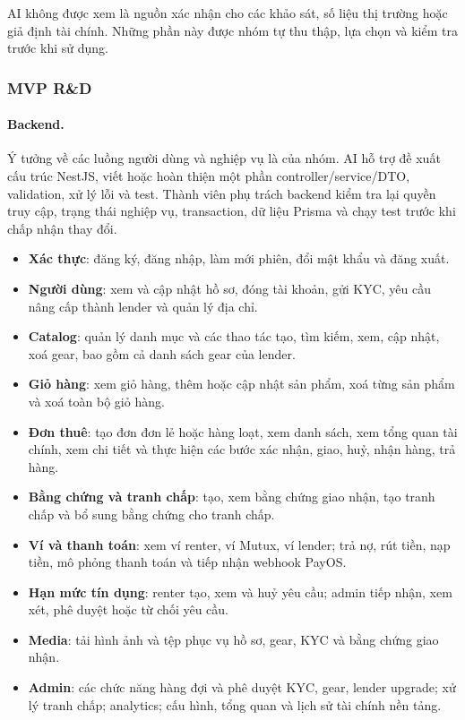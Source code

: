AI không được xem là nguồn xác nhận cho các khảo sát, số liệu thị trường hoặc
giả định tài chính. Những phần này được nhóm tự thu thập, lựa chọn và kiểm tra
trước khi sử dụng.

\subsubsection{MVP R\&D}

\paragraph{Backend.}
Ý tưởng về các luồng người dùng và nghiệp vụ là của nhóm. AI hỗ trợ đề xuất
cấu trúc NestJS, viết hoặc hoàn thiện một phần controller/service/DTO,
validation, xử lý lỗi và test. Thành viên phụ trách backend kiểm tra lại
quyền truy cập, trạng thái nghiệp vụ, transaction, dữ liệu Prisma và chạy test
trước khi chấp nhận thay đổi.
\begin{itemize}
    \item \textbf{Xác thực}: đăng ký, đăng nhập, làm mới phiên, đổi mật khẩu
    và đăng xuất.
    \item \textbf{Người dùng}: xem và cập nhật hồ sơ, đóng tài khoản, gửi KYC,
    yêu cầu nâng cấp thành lender và quản lý địa chỉ.
    \item \textbf{Catalog}: quản lý danh mục và các thao tác tạo, tìm kiếm,
    xem, cập nhật, xoá gear, bao gồm cả danh sách gear của lender.
    \item \textbf{Giỏ hàng}: xem giỏ hàng, thêm hoặc cập nhật sản phẩm, xoá
    từng sản phẩm và xoá toàn bộ giỏ hàng.
    \item \textbf{Đơn thuê}: tạo đơn đơn lẻ hoặc hàng loạt, xem danh sách,
    xem tổng quan tài chính, xem chi tiết và thực hiện các bước xác nhận, giao,
    huỷ, nhận hàng, trả hàng.
    \item \textbf{Bằng chứng và tranh chấp}: tạo, xem bằng chứng giao nhận,
    tạo tranh chấp và bổ sung bằng chứng cho tranh chấp.
    \item \textbf{Ví và thanh toán}: xem ví renter, ví Mutux, ví lender; trả
    nợ, rút tiền, nạp tiền, mô phỏng thanh toán và tiếp nhận webhook PayOS.
    \item \textbf{Hạn mức tín dụng}: renter tạo, xem và huỷ yêu cầu; admin
    tiếp nhận, xem xét, phê duyệt hoặc từ chối yêu cầu.
    \item \textbf{Media}: tải hình ảnh và tệp phục vụ hồ sơ, gear, KYC và
    bằng chứng giao nhận.
    \item \textbf{Admin}: các chức năng hàng đợi và phê duyệt KYC, gear,
    lender upgrade; xử lý tranh chấp; analytics; cấu hình, tổng quan và lịch
    sử tài chính nền tảng.
\end{itemize}

